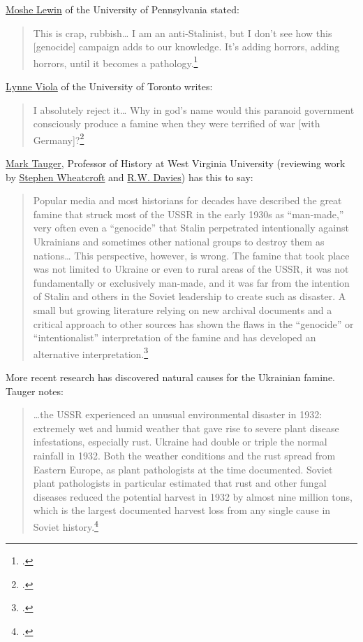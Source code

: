 \href{https://www.upenn.edu/emeritus/memoriam/Lewin.html}{Moshe Lewin}
of the University of Pennsylvania stated:

\begin{quote}
This is crap, rubbish\ldots{} I am an anti-Stalinist, but I don't see
how this {[}genocide{]} campaign adds to our knowledge. It's adding
horrors, adding horrors, until it becomes a pathology.\footcite{coplon1988search}
\end{quote}

\href{https://history.utoronto.ca/people/lynne-viola}{Lynne Viola} of
the University of Toronto writes:

\begin{quote}
I absolutely reject it\ldots{} Why in god's name would this paranoid
government consciously produce a famine when they were terrified of war
{[}with Germany{]}?\footcite{coplon1988search}
\end{quote}

\href{https://history.wvu.edu/faculty-and-staff/faculty/mark-b-tauger}{Mark
Tauger}, Professor of History at West Virginia University (reviewing
work by
\href{https://pursuit.unimelb.edu.au/individuals/professor-stephen-wheatcroft}{Stephen
Wheatcroft} and
\href{https://www.birmingham.ac.uk/staff/profiles/gov/davies-bob.aspx}{R.W.
Davies}) has this to say:

\begin{quote}
Popular media and most historians for decades have described the great
famine that struck most of the USSR in the early 1930s as ``man-made,''
very often even a ``genocide'' that Stalin perpetrated intentionally
against Ukrainians and sometimes other national groups to destroy them
as nations\ldots{} This perspective, however, is wrong. The famine that
took place was not limited to Ukraine or even to rural areas of the
USSR, it was not fundamentally or exclusively man-made, and it was far
from the intention of Stalin and others in the Soviet leadership to
create such as disaster. A small but growing literature relying on new
archival documents and a critical approach to other sources has shown
the flaws in the ``genocide'' or ``intentionalist'' interpretation of
the famine and has developed an alternative interpretation.\footcite{tauger2004}
\end{quote}

More recent research has discovered natural causes for the Ukrainian
famine. Tauger notes:

\begin{quote}
\ldots the USSR experienced an unusual environmental disaster in 1932:
extremely wet and humid weather that gave rise to severe plant disease
infestations, especially rust. Ukraine had double or triple the normal
rainfall in 1932. Both the weather conditions and the rust spread from
Eastern Europe, as plant pathologists at the time documented. Soviet
plant pathologists in particular estimated that rust and other fungal
diseases reduced the potential harvest in 1932 by almost nine million
tons, which is the largest documented harvest loss from any single cause
in Soviet history.\footcite{tauger2004}
\end{quote}

